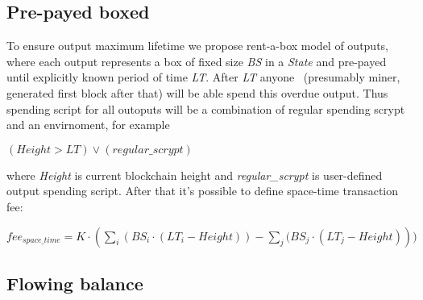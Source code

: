\documentclass[]{article}   %
\newcommand{\authnote}[2]{\marginpar{\parbox{\marginparwidth}{\tiny %
  \textsf{#1 {\textcolor{blue}{notes: #2}}}}}%
  \textcolor{blue}{\textbf{\dag}}}
\newcommand{\authnote}[2]{
  \textsf{#1 \textcolor{blue}{: #2}}}
\newcommand{\authnote}[2]{}
\newcommand{\dnote}[1]{{\authnote{\textcolor{blue}{Dima notes}}{#1}}}
\newcommand{\state}{\textit{State}}
\begin{document}
\subsection{Pre-payed boxed}

\dnote{описать}


To ensure output maximum lifetime we propose rent-a-box model of outputs, where each output represents a box of fixed size \textit{BS} in a \state{} and pre-payed until explicitly known period of time \textit{LT}. After \textit{LT} anyone ~(presumably miner, generated first block after that) will be able spend this overdue output. Thus spending script for all outoputs will be a combination of regular spending scrypt and an envirnoment, for example

$(Height > LT) \lor (regular\_scrypt)$

where \textit{Height} is current blockchain height and \textit{regular\_scrypt} is user-defined output spending script. After that it's possible to define space-time transaction fee:

$fee_{space\_time} = K \cdot (\sum_i{(BS_i \cdot (LT_i - Height))} - \sum_j{(BS_j \cdot (LT_j - Height)}))$

\subsection{Flowing balance}
\end{document}
